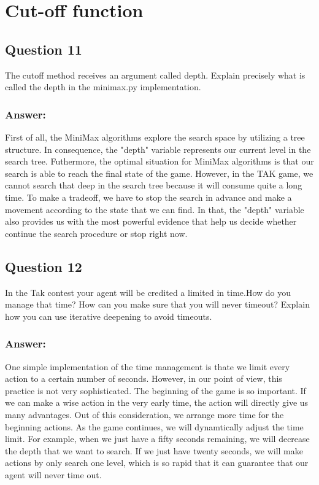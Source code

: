 \documentclass[12pt, a4paper]{report}
\begin{document}
\section{Cut-off function}
\subsection{Question 11}
The cutoff method receives an argument called depth. Explain precisely what is called the depth in the minimax.py implementation.
\subsubsection{Answer:}
First of all, the MiniMax algorithms explore the search space by utilizing a tree structure. In consequence, the "depth" variable represents our current level in the search tree. Futhermore, the optimal situation for MiniMax algorithms is that our search is able to reach the final state of the game. However, in the TAK game, we cannot search that deep in the search tree because it will consume quite a long time. To make a tradeoff, we have to stop the search in advance and make a movement according to the state that we can find. In that, the "depth" variable also provides us with the most powerful evidence that help us decide whether continue the search procedure or stop right now.


\subsection{Question 12}
In the Tak contest your agent will be credited a limited in time.How do you manage that time? How can you make sure that you will never timeout? Explain how you can use iterative deepening to avoid timeouts.
\subsubsection{Answer:}
One simple implementation of the time management is thate we limit every action to a certain number of seconds. However, in our point of view, this practice is not very sophisticated. The beginning of the game is so important. If we can make a wise action in the very early time, the action will directly give us many advantages. Out of this consideration, we arrange more time for the beginning actions. As the game continues, we will dynamtically adjust the time limit. For example, when we just have a fifty seconds remaining, we will decrease the depth that we want to search. If we just have twenty seconds, we will make actions by only search one level, which is so rapid that it can guarantee that our agent will never time out.
\end{document}
